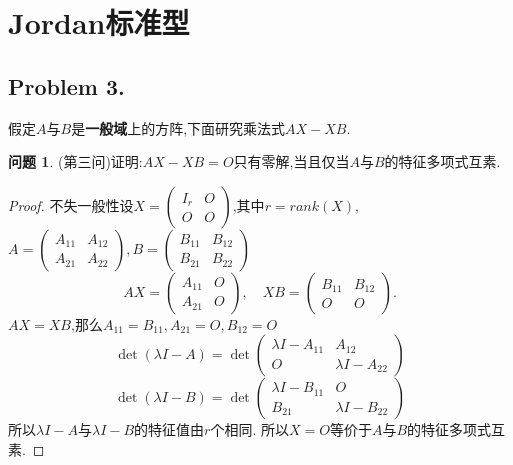 \documentclass[11pt]{ctexart}
\theoremstyle{definition}
\newtheorem{qqq}{问题}[section]
\numberwithin{equation}{section}
\begin{document}
\section{Jordan标准型}
\subsection{Problem 3.}
假定$A$与$B$是\textbf{一般域}上的方阵,下面研究乘法式$AX-XB$.
\begin{qqq}
    (第三问)证明:$AX-XB=O$只有零解,当且仅当$A$与$B$的特征多项式互素.
\end{qqq}
\begin{proof}
    不失一般性设$X=\begin{pmatrix}
        I_r&O\\O&O
    \end{pmatrix}$,其中$r=rank(X)$,$A=\begin{pmatrix}
        A_{11}&A_{12}\\A_{21}&A_{22}
    \end{pmatrix},B=\begin{pmatrix}
        B_{11}&B_{12}\\B_{21}&B_{22}
    \end{pmatrix}$\\
    \[AX=\begin{pmatrix}
        A_{11}&O\\A_{21}&O
    \end{pmatrix},\quad XB=\begin{pmatrix}
        B_{11}&B_{12}\\O&O
    \end{pmatrix}.\]
    $AX=XB$,那么$A_{11}=B_{11},A_{21}=O,B_{12}=O$
    \[\det(\lambda I-A)=\det \begin{pmatrix}
        \lambda I-A_{11}&A_{12}\\O&\lambda I-A_{22}
    \end{pmatrix}\]
    \[\det(\lambda I-B)=\det \begin{pmatrix}
        \lambda I-B_{11}&O\\B_{21}&\lambda I-B_{22}
    \end{pmatrix}\]
    所以$\lambda I-A$与$\lambda I-B$的特征值由$r$个相同.
    所以$X=O$等价于$A$与$B$的特征多项式互素.
\end{proof}
\[{}\]
\end{document}
